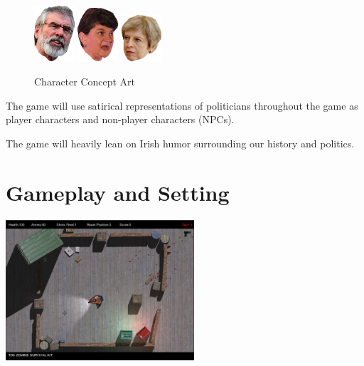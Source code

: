 \documentclass[a4paper]{scrreprt}
\begin{document}
\begin{figure}[H]
\begin{addmargin}[13.5em]{0em}
\includegraphics[width=1.5cm]{gerry-right}
\includegraphics[width=1.5cm]{arlene}
\includegraphics[width=1.5cm]{tess}
\end{addmargin}
\caption{\label{fig:art} Character Concept Art}
\end{figure}

\begin{flushleft}
The game will use satirical representations of politicians throughout the game as player characters and non-player characters (NPCs).
\end{flushleft}

\begin{flushleft}
The game will heavily lean on Irish humor surrounding our history and politics.
\end{flushleft}

\chapter{Gameplay and Setting}

\begin{center}
\includegraphics[width=7cm]{top-down}
\end{center}
\end{document}
